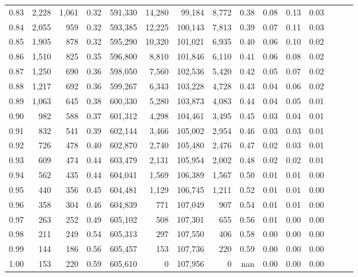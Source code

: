 \begin{tabular}{rrrrrrrrrrrrrrr}
0.83 &   2,228 &  1,061 &  0.32 &  591,330 &   14,280 &   99,184 &    8,772 &  0.38 &  0.08 &  0.13 &      0.03 \\
0.84 &   2,055 &    959 &  0.32 &  593,385 &   12,225 &  100,143 &    7,813 &  0.39 &  0.07 &  0.11 &      0.03 \\
0.85 &   1,905 &    878 &  0.32 &  595,290 &   10,320 &  101,021 &    6,935 &  0.40 &  0.06 &  0.10 &      0.02 \\
0.86 &   1,510 &    825 &  0.35 &  596,800 &    8,810 &  101,846 &    6,110 &  0.41 &  0.06 &  0.08 &      0.02 \\
0.87 &   1,250 &    690 &  0.36 &  598,050 &    7,560 &  102,536 &    5,420 &  0.42 &  0.05 &  0.07 &      0.02 \\
0.88 &   1,217 &    692 &  0.36 &  599,267 &    6,343 &  103,228 &    4,728 &  0.43 &  0.04 &  0.06 &      0.02 \\
0.89 &   1,063 &    645 &  0.38 &  600,330 &    5,280 &  103,873 &    4,083 &  0.44 &  0.04 &  0.05 &      0.01 \\
0.90 &     982 &    588 &  0.37 &  601,312 &    4,298 &  104,461 &    3,495 &  0.45 &  0.03 &  0.04 &      0.01 \\
0.91 &     832 &    541 &  0.39 &  602,144 &    3,466 &  105,002 &    2,954 &  0.46 &  0.03 &  0.03 &      0.01 \\
0.92 &     726 &    478 &  0.40 &  602,870 &    2,740 &  105,480 &    2,476 &  0.47 &  0.02 &  0.03 &      0.01 \\
0.93 &     609 &    474 &  0.44 &  603,479 &    2,131 &  105,954 &    2,002 &  0.48 &  0.02 &  0.02 &      0.01 \\
0.94 &     562 &    435 &  0.44 &  604,041 &    1,569 &  106,389 &    1,567 &  0.50 &  0.01 &  0.01 &      0.00 \\
0.95 &     440 &    356 &  0.45 &  604,481 &    1,129 &  106,745 &    1,211 &  0.52 &  0.01 &  0.01 &      0.00 \\
0.96 &     358 &    304 &  0.46 &  604,839 &      771 &  107,049 &      907 &  0.54 &  0.01 &  0.01 &      0.00 \\
0.97 &     263 &    252 &  0.49 &  605,102 &      508 &  107,301 &      655 &  0.56 &  0.01 &  0.00 &      0.00 \\
0.98 &     211 &    249 &  0.54 &  605,313 &      297 &  107,550 &      406 &  0.58 &  0.00 &  0.00 &      0.00 \\
0.99 &     144 &    186 &  0.56 &  605,457 &      153 &  107,736 &      220 &  0.59 &  0.00 &  0.00 &      0.00 \\
1.00 &     153 &    220 &  0.59 &  605,610 &        0 &  107,956 &        0 &   nan &  0.00 &  0.00 &      0.00 \\
\bottomrule
\end{tabular}
